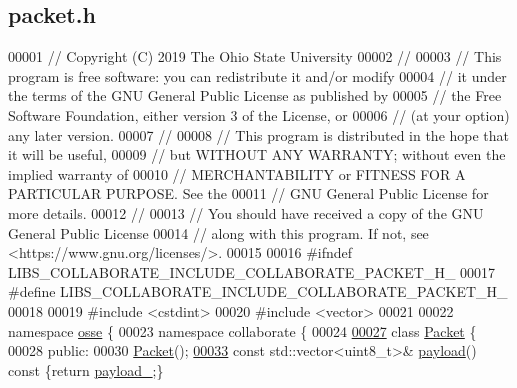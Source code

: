 \hypertarget{packet_8h_source}{}\subsection{packet.\+h}
\label{packet_8h_source}

\begin{DoxyCode}
00001 \textcolor{comment}{// Copyright (C) 2019 The Ohio State University}
00002 \textcolor{comment}{//}
00003 \textcolor{comment}{// This program is free software: you can redistribute it and/or modify}
00004 \textcolor{comment}{// it under the terms of the GNU General Public License as published by}
00005 \textcolor{comment}{// the Free Software Foundation, either version 3 of the License, or}
00006 \textcolor{comment}{// (at your option) any later version.}
00007 \textcolor{comment}{//}
00008 \textcolor{comment}{// This program is distributed in the hope that it will be useful,}
00009 \textcolor{comment}{// but WITHOUT ANY WARRANTY; without even the implied warranty of}
00010 \textcolor{comment}{// MERCHANTABILITY or FITNESS FOR A PARTICULAR PURPOSE.  See the}
00011 \textcolor{comment}{// GNU General Public License for more details.}
00012 \textcolor{comment}{//}
00013 \textcolor{comment}{// You should have received a copy of the GNU General Public License}
00014 \textcolor{comment}{// along with this program.  If not, see <https://www.gnu.org/licenses/>.}
00015 
00016 \textcolor{preprocessor}{#ifndef LIBS\_COLLABORATE\_INCLUDE\_COLLABORATE\_PACKET\_H\_}
00017 \textcolor{preprocessor}{#define LIBS\_COLLABORATE\_INCLUDE\_COLLABORATE\_PACKET\_H\_}
00018 
00019 \textcolor{preprocessor}{#include <cstdint>}
00020 \textcolor{preprocessor}{#include <vector>}
00021 
00022 \textcolor{keyword}{namespace }\hyperlink{namespaceosse}{osse} \{
00023 \textcolor{keyword}{namespace }collaborate \{
00024 
\hyperlink{classosse_1_1collaborate_1_1_packet}{00027} \textcolor{keyword}{class }\hyperlink{classosse_1_1collaborate_1_1_packet}{Packet} \{
00028  \textcolor{keyword}{public}:
00030   \hyperlink{classosse_1_1collaborate_1_1_packet_aecb3018048e1845ea9e45dcd008cc0df}{Packet}();
\hyperlink{classosse_1_1collaborate_1_1_packet_a6034dd26382166bf4feeed7cecda3e54}{00033}   \textcolor{keyword}{const} std::vector<uint8\_t>& \hyperlink{classosse_1_1collaborate_1_1_packet_a6034dd26382166bf4feeed7cecda3e54}{payload}()\textcolor{keyword}{ const }\{\textcolor{keywordflow}{return} \hyperlink{classosse_1_1collaborate_1_1_packet_a1917bbaba5a0fb4757947d2626287410}{payload\_};\}

\end{DoxyCode}
